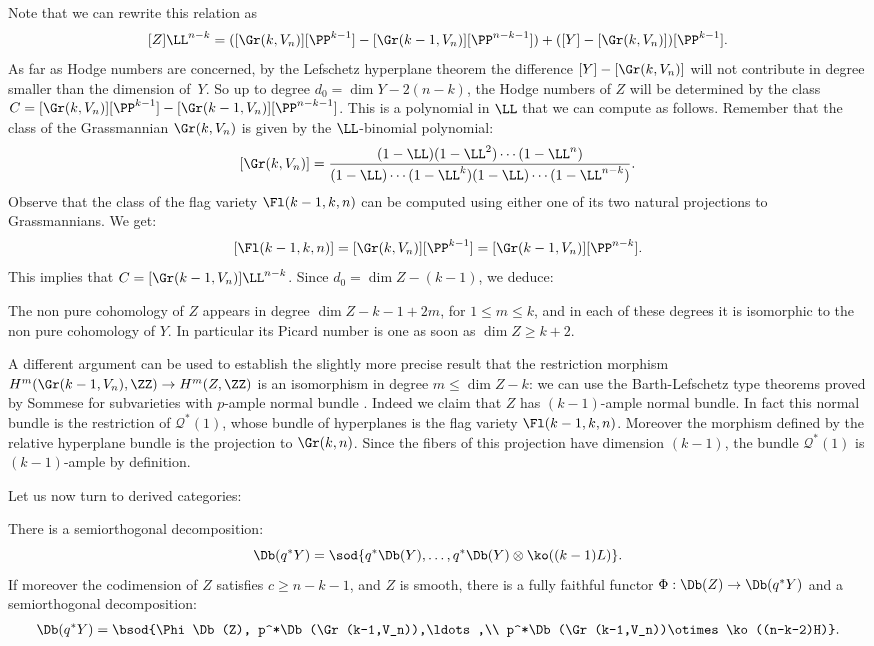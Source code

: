 Note that we can rewrite this relation as
\[
[Z]\LL^{n-k}=
([\Gr(k,V_n)][\PP^{k-1}]-[\Gr(k-1,V_n)][\PP^{n-k-1}])+([Y]-[\Gr(k,V_n)])[\PP^{k-1}].
\]
As far as Hodge numbers are concerned, by the Lefschetz hyperplane theorem the difference
$[Y]-[\Gr(k,V_n)]$ will
not contribute in degree smaller than the dimension of~$Y$. So up to degree $d_0=\dim Y-2(n-k)$,
the Hodge numbers of $Z$ will be determined by the class $C=[\Gr(k,V_n)][\PP^{k-1}]-[\Gr(k-1,V_n)][\PP^{n-k-1}]$.
This is a polynomial in $\LL$ that we can compute as follows. Remember that the class of the Grassmannian $\Gr(k,V_n)$
is given by the $\LL$-binomial polynomial:
\[
[\Gr(k,V_n)]=\frac{(1-\LL)(1-\LL^2)\cdots (1-\LL^n)}{(1-\LL)\cdots (1-\LL^k)(1-\LL)\cdots (1-\LL^{n-k})}.
\]
Observe that the class of the flag variety $\Fl(k-1,k,n)$ can be computed using either one of its two natural
projections to Grassmannians. We get:
\[
[\Fl(k-1,k,n)]=[\Gr(k,V_n)][\PP^{k-1}]=[\Gr(k-1,V_n)][\PP^{n-k}].
\]
This implies that $C=[\Gr(k-1,V_n)]\LL^{n-k}$. Since $d_0=\dim Z-(k-1)$, we deduce:

\begin{cor}\label{hodgeZ}
The non pure cohomology of $Z$ appears in degree \hbox{$\dim Z\!-\!k\!-\!1\!+\!2m$}, for $1\le m\le k$,
and in each of these degrees it is isomorphic to the non pure cohomology of $Y$.
In particular its Picard number is one as soon as $\dim Z\ge k+2$.
\end{cor}

A different argument can be used to establish the slightly more precise result that the restriction morphism $H^m(\Gr(k-1,V_n),\ZZ)\to H^m(Z,\ZZ)$ is an isomorphism
in degree $m\le \dim Z -k$: we can use the Barth-Lefschetz type theorems proved
by Sommese for subvarieties with $p$-ample normal bundle \cite[Prop.\,2.6]{sommese}. Indeed we
claim that $Z$ has $(k-1)$-ample normal bundle. In fact this normal bundle is the restriction of
$\mathcal{Q}^*(1)$, whose bundle of hyperplanes is the flag variety $\Fl(k-1,k,n)$. Moreover the morphism
defined by the relative hyperplane bundle is the projection to $\Gr(k,n)$. Since the fibers of
this projection have dimension $(k-1)$, the bundle $\mathcal{Q}^*(1)$ is $(k-1)$-ample by definition.

Let us now turn to derived categories:

\begin{prop}\label{prop:semiorth-for-Hsections-in-jumps}
There is a semiorthogonal decomposition:
\begin{equation}\label{eq:orlov-deco-jump}
\Db(q^* Y) = \sod{q^*\Db(Y),\ldots,q^*\Db(Y)\otimes \ko((k-1)L)}.
\end{equation}
If moreover the codimension of $Z$ satisfies $c \geq n-k-1$, and $Z$ is smooth, there is a fully faithful functor
$\Phi: \Db(Z) \to \Db(q^* Y)$ and a semiorthogonal decomposition:%
\begin{multline}\label{eq:our-deco-jump}
\Db(q^* Y)
= \bsod{\Phi\Db(Z), p^*\Db(\Gr(k-1,V_n)),\ldots,\\
p^*\Db(\Gr(k-1,V_n))\otimes \ko((n-k-2)H)}.
\end{multline}
\end{prop}


